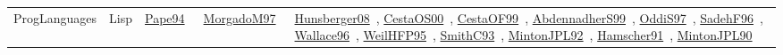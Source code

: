 {\begin{longtable}{lp{3cm}>{\raggedright\arraybackslash}p{6cm}>{\raggedright\arraybackslash}p{6cm}>{\raggedright\arraybackslash}p{8cm}}
\index{Lisp}\index{ProgLanguages!Lisp}ProgLanguages & Lisp & \href{../works/Pape94.pdf}{Pape94}~\cite{Pape94} & \href{../works/MorgadoM97.pdf}{MorgadoM97}~\cite{MorgadoM97} & \href{../works/Hunsberger08.pdf}{Hunsberger08}~\cite{Hunsberger08}, \href{../works/CestaOS00.pdf}{CestaOS00}~\cite{CestaOS00}, \href{../works/CestaOF99.pdf}{CestaOF99}~\cite{CestaOF99}, \href{../works/AbdennadherS99.pdf}{AbdennadherS99}~\cite{AbdennadherS99}, \href{../works/OddiS97.pdf}{OddiS97}~\cite{OddiS97}, \href{../works/SadehF96.pdf}{SadehF96}~\cite{SadehF96}, \href{../works/Wallace96.pdf}{Wallace96}~\cite{Wallace96}, \href{../works/WeilHFP95.pdf}{WeilHFP95}~\cite{WeilHFP95}, \href{../works/SmithC93.pdf}{SmithC93}~\cite{SmithC93}, \href{../works/MintonJPL92.pdf}{MintonJPL92}~\cite{MintonJPL92}, \href{../works/Hamscher91.pdf}{Hamscher91}~\cite{Hamscher91}, \href{../works/MintonJPL90.pdf}{MintonJPL90}~\cite{MintonJPL90}\\

\end{longtable}}
